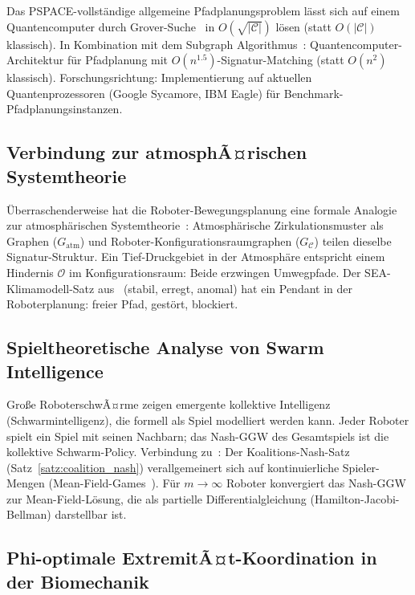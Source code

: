 ﻿\documentclass[a4paper,12pt]{article}
\theoremstyle{definition}
\newcommand{\Cspace}{\mathcal{C}}
\begin{document}
Das PSPACE-vollst\"andige allgemeine Pfadplanungsproblem l\"asst sich auf
einem Quantencomputer durch Grover-Suche~\cite{grover1996} in
$O(\sqrt{|\Cspace|})$ l\"osen (statt $O(|\Cspace|)$ klassisch).
In Kombination mit dem Subgraph Algorithmus~\cite{epp2026qsubgraph}:
Quantencomputer-Architektur f\"ur Pfadplanung mit
$O(n^{1.5})$-Signatur-Matching (statt $O(n^2)$ klassisch).
Forschungsrichtung: Implementierung auf aktuellen Quantenprozessoren
(Google Sycamore, IBM Eagle) f\"ur Benchmark-Pfadplanungsinstanzen.

\subsection{Verbindung zur atmosphÃ¤rischen Systemtheorie}

\"Uberraschenderweise hat die Roboter-Bewegungsplanung eine formale Analogie
zur atmosph\"arischen Systemtheorie~\cite{epp2026klima}:
Atmosph\"arische Zirkulationsmuster als Graphen ($G_{\mathrm{atm}}$) und
Roboter-Konfigurationsraumgraphen ($G_{\Cspace}$) teilen dieselbe
Signatur-Struktur.
Ein Tief-Druckgebiet in der Atmosph\"are entspricht einem Hindernis $\mathcal{O}$
im Konfigurationsraum: Beide erzwingen Umwegpfade.
Der SEA-Klimamodell-Satz aus~\cite{epp2026klima} (stabil, erregt, anomal)
hat ein Pendant in der Roboterplanung: freier Pfad, gest\"ort, blockiert.

\subsection{Spieltheoretische Analyse von Swarm Intelligence}

Gro{\ss}e RoboterschwÃ¤rme zeigen emergente kollektive Intelligenz
(Schwarmintelligenz), die formell als Spiel modelliert werden kann.
Jeder Roboter spielt ein Spiel mit seinen Nachbarn; das Nash-GGW des
Gesamtspiels ist die kollektive Schwarm-Policy.
Verbindung zu~\cite{epp2026spieltheorie}: Der Koalitions-Nash-Satz
(Satz~\ref{satz:coalition_nash}) verallgemeinert sich auf kontinuierliche
Spieler-Mengen (Mean-Field-Games~\cite{lasry2007}).
F\"ur $m \to \infty$ Roboter konvergiert das Nash-GGW zur Mean-Field-L\"osung,
die als partielle Differentialgleichung (Hamilton-Jacobi-Bellman)
darstellbar ist.

\subsection{Phi-optimale ExtremitÃ¤t-Koordination in der Biomechanik}
\end{document}
